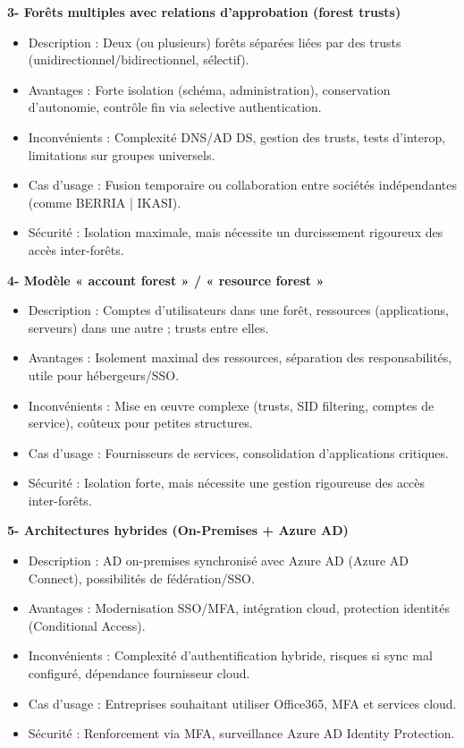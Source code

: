 \noindent \textbf{3- Forêts multiples avec relations d'approbation (forest trusts)}
\begin{itemize}
	\item Description : Deux (ou plusieurs) forêts séparées liées par des trusts (unidirectionnel/bidirectionnel, sélectif).
	\item Avantages : Forte isolation (schéma, administration), conservation d'autonomie, contrôle fin via selective authentication.
	\item Inconvénients : Complexité DNS/AD DS, gestion des trusts, tests d'interop, limitations sur groupes universels.
	\item Cas d'usage : Fusion temporaire ou collaboration entre sociétés indépendantes (comme BERRIA | IKASI).
	\item Sécurité : Isolation maximale, mais nécessite un durcissement rigoureux des accès inter-forêts.
\end{itemize}

\noindent \textbf{4- Modèle « account forest » / « resource forest »}
\begin{itemize}
	\item Description : Comptes d'utilisateurs dans une forêt, ressources (applications, serveurs) dans une autre ; trusts entre elles.
	\item Avantages : Isolement maximal des ressources, séparation des responsabilités, utile pour hébergeurs/SSO.
	\item Inconvénients : Mise en œuvre complexe (trusts, SID filtering, comptes de service), coûteux pour petites structures.
	\item Cas d'usage : Fournisseurs de services, consolidation d'applications critiques.
	\item Sécurité : Isolation forte, mais nécessite une gestion rigoureuse des accès inter-forêts.
\end{itemize}

\noindent \textbf{5- Architectures hybrides (On-Premises + Azure AD)}
\begin{itemize}
	\item Description : AD on-premises synchronisé avec Azure AD (Azure AD Connect), possibilités de fédération/SSO.
	\item Avantages : Modernisation SSO/MFA, intégration cloud, protection identités (Conditional Access).
	\item Inconvénients : Complexité d'authentification hybride, risques si sync mal configuré, dépendance fournisseur cloud.
	\item Cas d'usage : Entreprises souhaitant utiliser Office365, MFA et services cloud.
	\item Sécurité : Renforcement via MFA, surveillance Azure AD Identity Protection.
\end{itemize}


